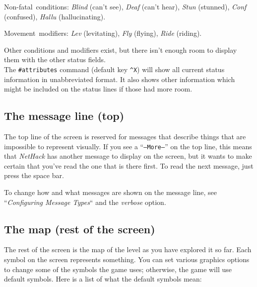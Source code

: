 \documentclass[titlepage]{article}
\begin{document}
\begin{description}
Non-fatal~conditions:
\textit{Blind} (can't see), \textit{Deaf} (can't hear),
\textit{Stun} (stunned), \textit{Conf} (confused), \textit{Hallu} (hallucinating).

Movement~modifiers:
\textit{Lev} (levitating), \textit{Fly} (flying), \textit{Ride} (riding).

Other conditions and modifiers exist, but there isn't enough room to
display them with the other status fields.
\\
The \texttt{\#attributes} command (default key \texttt{\textasciicircum X}) will show
all current status information in unabbreviated format.
It also shows other information which might be included on the status
lines if those had more room.

\end{description}

\subsection*{The message line (top)}

The top line of the screen is reserved for messages that describe
things that are impossible to represent visually.  If you see a
``\texttt{--More--}'' on the top line, this means that \textit{NetHack} has
another message to display on the screen, but it wants to make certain
that you've read the one that is there first.  To read the next message,
just press the space bar.

To change how and what messages are shown on the message line,
see ``\textit{Configuring Message Types}`` and the \textit{verbose}
option.

\subsection*{The map (rest of the screen)}

The rest of the screen is the map of the level as you have explored it
so far.  Each symbol on the screen represents something.  You can set
various graphics
options to change some of the symbols the game uses; otherwise, the
game will use default symbols.  Here is a list of what the default
symbols mean:
\end{document}
